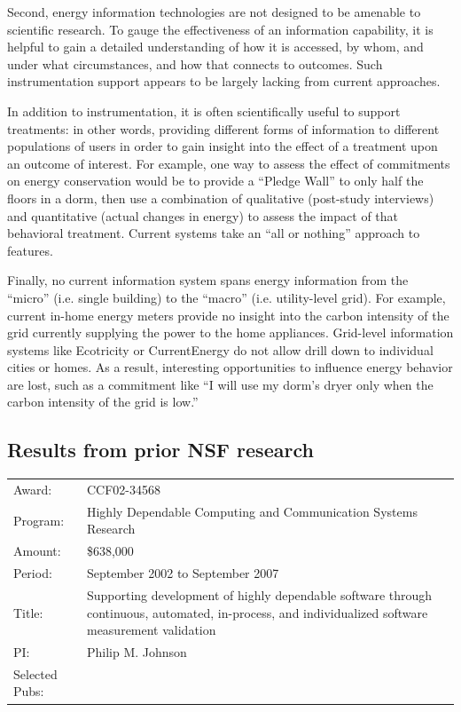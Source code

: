Second, energy information technologies are not designed to be amenable to
scientific research.  To gauge the effectiveness of an information
capability, it is helpful to gain a detailed understanding of how it is
accessed, by whom, and under what circumstances, and how that connects
to outcomes.  Such instrumentation support appears to be largely lacking
from current approaches.

In addition to instrumentation, it is often scientifically useful to
support treatments: in other words, providing different forms of
information to different populations of users in order to gain insight into
the effect of a treatment upon an outcome of interest. For example, one way
to assess the effect of commitments on energy conservation would be to
provide a ``Pledge Wall'' to only half the floors in a dorm, then use a
combination of qualitative (post-study interviews) and quantitative (actual
changes in energy) to assess the impact of that behavioral
treatment. Current systems take an ``all or nothing'' approach to
features. 

Finally, no current information system spans energy information from the ``micro''
(i.e. single building) to the ``macro'' (i.e. utility-level grid).  For
example, current in-home energy meters provide no insight into the carbon
intensity of the grid currently supplying the power to the home appliances.
Grid-level information systems like Ecotricity or CurrentEnergy do not
allow drill down to individual cities or homes.  As a result, interesting
opportunities to influence energy behavior are lost, such as a commitment
like ``I will use my dorm's dryer only when the carbon intensity of the
grid is low.''

\subsection{Results from prior NSF research}

\begin{tabular}{p{1in}p{5in}}
\small
Award: & CCF02-34568 \\ 
Program: & Highly Dependable Computing and Communication Systems Research\\ 
Amount: & \$638,000 \\ 
Period: & September 2002 to September 2007 \\ 
Title: & Supporting development of highly dependable software through
continuous, automated, in-process, and individualized software measurement validation \\ 
PI: & Philip M. Johnson \\ 
Selected Pubs: & \cite{csdl2-04-22,csdl2-04-13,csdl2-04-11,csdl2-03-12,
csdl2-02-07,csdl2-03-07,csdl2-04-02,csdl2-04-04,csdl2-04-11,csdl2-06-07,csdl2-06-08,csdl2-06-13,csdl2-06-06,csdl2-09-01}
\end{tabular} \\ %

